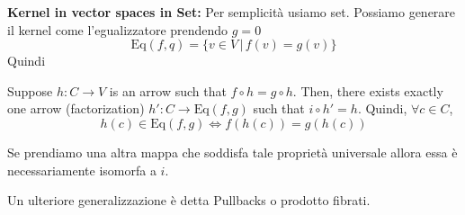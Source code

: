 \documentclass[a4paper]{article}
\begin{document}
\textbf{Kernel in vector spaces in Set:}
Per semplicità usiamo set.
Possiamo generare il kernel come l'egualizzatore prendendo \(g=0\)
\[
    \text{Eq}(f,q) = \{v \in V \,|\, f(v) = g(v)\}
\]
Quindi 
Suppose \(h \colon C \to V\)
is an arrow such that \(f \circ h = g \circ h\).
Then, there exists exactly one arrow (factorization)
\(h' \colon C \to \text{Eq}(f,g)\)
such that \(i \circ h' = h\).
Quindi, \(\forall c \in C\),
\[
    h(c) \in \text{Eq}(f,g) \iff f(h(c)) = g(h(c))
\]

Se prendiamo una altra mappa che soddisfa tale proprietà universale allora essa
è necessariamente isomorfa a \(i\).

Un ulteriore generalizzazione è detta Pullbacks o prodotto fibrati.
\end{document}
